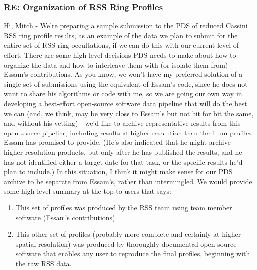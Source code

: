 \documentclass[crop=false,class=article,oneside]{standalone}
\begin{document}
\subsubsection{\footnotesize RE: Organization of RSS Ring Profiles}
Hi, Mitch - We're preparing a sample submission to the PDS of reduced Cassini RSS ring profile results, as an example of the data we plan to submit for the entire set of RSS ring occultations, if we can do this with our current level of effort. There are some high-level decisions PDS needs to make about how to organize the data and how to interleave them with (or isolate them from) Essam's contributions. As you know, we won't have my preferred solution of a single set of submissions using the equivalent of Essam's code, since he does not want to share his algorithms or code with me, so we are going our own way in developing a best-effort open-source software data pipeline that will do the best we can (and, we think, may be very close to Essam's but not bit for bit the same, and without his vetting) - we'd like to archive representative results from this open-source pipeline, including results at higher resolution than the 1 km profiles Essam has promised to provide. (He's also indicated that he might archive higher-resolution products, but only after he has published the results, and he has not identified either a target date for that task, or the specific results he'd plan to include.) In this situation, I think it might make sense for our PDS archive to be separate from Essam's, rather than intermingled. We would provide some high-level summary at the top to users that says:
\begin{enumerate}
    \item This set of profiles was produced by the RSS team using team member software (Essam's contributions).
    \item This other set of profiles (probably more complete and certainly at higher spatial resolution) was produced by thoroughly documented open-source software that enables any user to reproduce the final profiles, beginning with the raw RSS data.
\end{enumerate}
\end{document}

